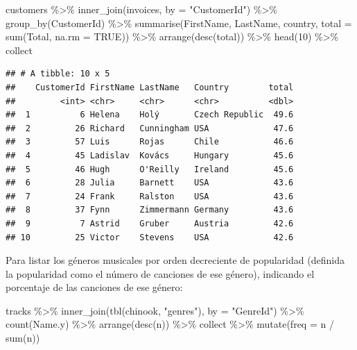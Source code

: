 \documentclass[
]{book}
\newenvironment{Shaded}{\begin{snugshade}}{\end{snugshade}}
\newcommand{\AttributeTok}[1]{\textcolor[rgb]{0.77,0.63,0.00}{#1}}
\newcommand{\ConstantTok}[1]{\textcolor[rgb]{0.00,0.00,0.00}{#1}}
\newcommand{\DecValTok}[1]{\textcolor[rgb]{0.00,0.00,0.81}{#1}}
\newcommand{\FunctionTok}[1]{\textcolor[rgb]{0.00,0.00,0.00}{#1}}
\newcommand{\NormalTok}[1]{#1}
\newcommand{\SpecialCharTok}[1]{\textcolor[rgb]{0.00,0.00,0.00}{#1}}
\newcommand{\StringTok}[1]{\textcolor[rgb]{0.31,0.60,0.02}{#1}}
\theoremstyle{break}
\theoremstyle{nonumberplain}
\begin{document}
\begin{Shaded}
\begin{Highlighting}[]
\NormalTok{customers }\SpecialCharTok{\%\textgreater{}\%} \FunctionTok{inner\_join}\NormalTok{(invoices, }\AttributeTok{by =} \StringTok{"CustomerId"}\NormalTok{) }\SpecialCharTok{\%\textgreater{}\%} \FunctionTok{group\_by}\NormalTok{(CustomerId) }\SpecialCharTok{\%\textgreater{}\%} 
    \FunctionTok{summarise}\NormalTok{(FirstName, LastName, country, }\AttributeTok{total =} \FunctionTok{sum}\NormalTok{(Total, }\AttributeTok{na.rm =} \ConstantTok{TRUE}\NormalTok{)) }\SpecialCharTok{\%\textgreater{}\%}  
    \FunctionTok{arrange}\NormalTok{(}\FunctionTok{desc}\NormalTok{(total)) }\SpecialCharTok{\%\textgreater{}\%} \FunctionTok{head}\NormalTok{(}\DecValTok{10}\NormalTok{) }\SpecialCharTok{\%\textgreater{}\%}\NormalTok{ collect}
\end{Highlighting}
\end{Shaded}

\begin{verbatim}
## # A tibble: 10 x 5
##    CustomerId FirstName LastName   Country        total
##         <int> <chr>     <chr>      <chr>          <dbl>
##  1          6 Helena    Holý       Czech Republic  49.6
##  2         26 Richard   Cunningham USA             47.6
##  3         57 Luis      Rojas      Chile           46.6
##  4         45 Ladislav  Kovács     Hungary         45.6
##  5         46 Hugh      O'Reilly   Ireland         45.6
##  6         28 Julia     Barnett    USA             43.6
##  7         24 Frank     Ralston    USA             43.6
##  8         37 Fynn      Zimmermann Germany         43.6
##  9          7 Astrid    Gruber     Austria         42.6
## 10         25 Victor    Stevens    USA             42.6
\end{verbatim}

Para listar los géneros musicales por orden decreciente de popularidad (definida la popularidad como el número de canciones de ese género), indicando el porcentaje de las canciones de ese género:

\begin{Shaded}
\begin{Highlighting}[]
\NormalTok{tracks }\SpecialCharTok{\%\textgreater{}\%} \FunctionTok{inner\_join}\NormalTok{(}\FunctionTok{tbl}\NormalTok{(chinook, }\StringTok{"genres"}\NormalTok{), }\AttributeTok{by =} \StringTok{"GenreId"}\NormalTok{) }\SpecialCharTok{\%\textgreater{}\%} \FunctionTok{count}\NormalTok{(Name.y) }\SpecialCharTok{\%\textgreater{}\%} 
    \FunctionTok{arrange}\NormalTok{(}\FunctionTok{desc}\NormalTok{(n)) }\SpecialCharTok{\%\textgreater{}\%}\NormalTok{ collect }\SpecialCharTok{\%\textgreater{}\%} \FunctionTok{mutate}\NormalTok{(}\AttributeTok{freq =}\NormalTok{ n }\SpecialCharTok{/} \FunctionTok{sum}\NormalTok{(n))}
\end{Highlighting}
\end{Shaded}
\end{document}
